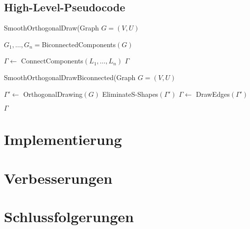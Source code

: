 \documentclass[a4paper]{scrreprt}
\theoremstyle{definition}
\begin{document}
\section{High-Level-Pseudocode}


\begin{algorithm}[ht]
  \caption{SmoothOrthogonalDraw(Graph $G = (V,U)$}
  \label{alg:main}
  
  $G_1, \dots, G_n = $BiconnectedComponents$(G)$ \;
  
  $\Gamma \leftarrow$ ConnectComponents$(L_1, \dots, L_n)$ \;
  \Return $\Gamma$
\end{algorithm}

\begin{algorithm}[ht]
  \caption{SmoothOrthogonalDrawBiconnected(Graph $G = (V,U)$}
  \label{alg:biconnected}
  
  $\Gamma' \leftarrow$ OrthogonalDrawing$(G)$ \;
  EliminateS-Shapes$(\Gamma')$ \;
  $\Gamma \leftarrow$ DrawEdges$(\Gamma')$ \;
  
  \Return $\Gamma$
\end{algorithm}


\chapter{Implementierung}

\chapter{Verbesserungen}

\chapter{Schlussfolgerungen}








\end{document}
